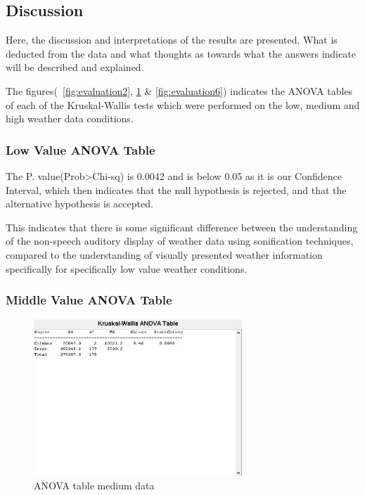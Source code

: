 \subsection{Discussion} %
\label{sub:discussion}

Here, the discussion and interpretations of the results are presented. 
What is deducted from the data and what thoughts as towards what the answers indicate will be described and explained.

The figures(~\ref{fig:evaluation2}, \ref*{fig:evaluation5} \&  \ref*{fig:evaluation6}) indicates the ANOVA tables of each of the Kruskal-Wallis tests which were performed on the low, medium and high weather data conditions.

\subsubsection*{Low Value ANOVA Table} %
\label{ssub:low_value_anova_table}

The P. value(Prob>Chi-sq) is 0.0042 and is below 0.05 as it is our Confidence Interval, which then indicates that the null hypothesis is rejected, and that the alternative hypothesis is accepted.

This indicates that there is some significant difference between the understanding of the non-speech auditory display of weather data using sonification techniques, compared to the understanding of visually presented weather information specifically for specifically low value weather conditions.


\subsubsection*{Middle Value ANOVA Table} %
\label{ssub:middle_value_anova_table}

\begin{figure}[!htbp]
    \centering
    \includegraphics[width=0.7\textwidth]{images/Evaluation5.jpg}
    \caption{ANOVA table medium data}
    \label{fig:evaluation5}
\end{figure}

